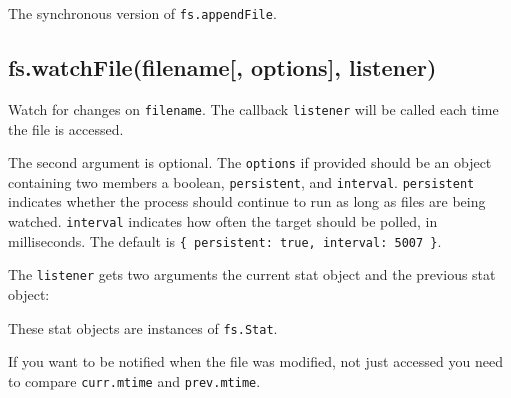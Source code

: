 The synchronous version of \texttt{fs.appendFile}.

\subsection{fs.watchFile(filename{[}, options{]},
listener)}\label{fs.watchfilefilename-options-listener}

\begin{Shaded}
\begin{Highlighting}[]
 \NormalTok{- }  \NormalTok{, } 
\end{Highlighting}
\end{Shaded}

Watch for changes on \texttt{filename}. The callback \texttt{listener}
will be called each time the file is accessed.

The second argument is optional. The \texttt{options} if provided should
be an object containing two members a boolean, \texttt{persistent}, and
\texttt{interval}. \texttt{persistent} indicates whether the process
should continue to run as long as files are being watched.
\texttt{interval} indicates how often the target should be polled, in
milliseconds. The default is
\texttt{\{\ persistent:\ true,\ interval:\ 5007\ \}}.

The \texttt{listener} gets two arguments the current stat object and the
previous stat object:

\begin{Shaded}
\begin{Highlighting}[]
\NormalTok{(}\NormalTok{, } 
  \NormalTok{(} \NormalTok{+ }\NormalTok{);}
  \NormalTok{(} \NormalTok{+ }\NormalTok{);}
\NormalTok{\});}
\end{Highlighting}
\end{Shaded}

These stat objects are instances of \texttt{fs.Stat}.

If you want to be notified when the file was modified, not just accessed
you need to compare \texttt{curr.mtime} and \texttt{prev.mtime}.

